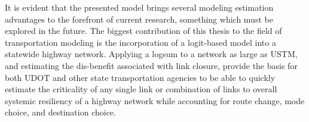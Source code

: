 It is evident that the presented model brings several
modeling estimation advantages to the forefront of current research, something which must be
explored in the future. The biggest contribution of this thesis to
the field of transportation modeling is the incorporation of a logit-based model
into a statewide highway network. Applying a logsum to a network as large as USTM, and
estimating the dis-benefit associated with link closure, provide the basis for both
UDOT and other state transportation agencies to be able to quickly estimate
the criticality of any single link or combination of links to overall systemic
resiliency of a highway network while accounting for route change, mode choice, and destination choice.
